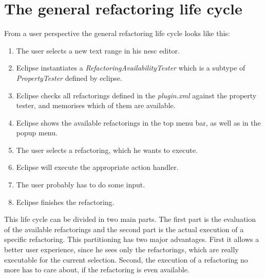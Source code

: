 \documentclass[a4paper,10pt]{report}
\begin{document}
\section{The general refactoring life cycle}
From a user perspective the general refactoring life cycle looks like this:
   \begin{enumerate}
     \item The user selects a new text range in his nesc editor.
     \item Eclipse instantiates a {\it RefactoringAvailabilityTester} which is a subtype of {\it PropertyTester} defined by eclipse.
     \item Eclipse checks all refactorings defined in the {\it plugin.xml} against the property tester, and memorises which of them are available. 
     \item Eclipse shows the available refactorings in the top menu bar, as well as in the popup menu.
     \item The user selects a refactoring, which he wants to execute.
     \item Eclipse will execute the appropriate action handler.
     \item The user probably has to do some input.
     \item Eclipse finishes the refactoring.
   \end{enumerate}
This life cycle can be divided in two main parts. The first part is the evaluation of the available refactorings and the second part is the actual execution of a specific refactoring. 
This partitioning has two major advantages. First it allows a better user experience, since he sees only the refactorings, which are really executable for the current selection. 
Second, the execution of a refactoring no more has to care about, if the refactoring is even available.
\end{document}
